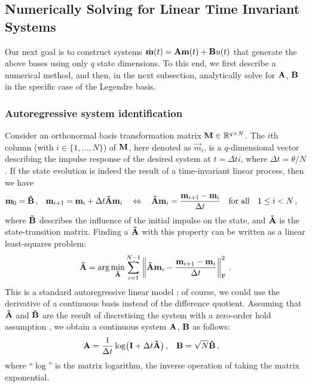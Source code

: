 \subsection{Numerically Solving for Linear Time Invariant Systems}
\label{sec:lti_autoregression}

Our next goal is to construct \LTI systems $\dot{\mathbf{m}}(t) = \mathbf{A} \mathbf{m}(t) + \mathbf{B} u(t)$ that generate the above bases using only $q$ state dimensions.
To this end, we first describe a numerical method, and then, in the next subsection, analytically solve for $\mathbf{A}$, $\mathbf{B}$ in the specific case of the Legendre basis.

\subsubsection{Autoregressive system identification}
Consider an orthonormal basis transformation matrix $\mathbf{M} \in \mathbb{R}^{q \times N}$. The $i$th column (with $i \in \{1, \ldots, N\}$) of $\mathbf{M}$, here denoted as $\vec m_i$, is a $q$-dimensional vector describing the impulse response of the desired system at $t = \Delta t i$, where $\Delta t = \theta / N$.
If the state evolution is indeed the result of a time-invariant linear process, then we have
\begin{align*}
	\mathbf{m}_0 &= \mathbf{\tilde B} \,, &
	\mathbf{m}_{i + 1} &= \mathbf{m}_{i} + \Delta t \mathbf{\tilde A} \mathbf{m}_i
	\quad \Leftrightarrow \quad
	\mathbf{\tilde A} \mathbf{m}_{i} = \frac{\mathbf{m}_{i + 1} - \mathbf{m}_i}{\Delta t} \quad \text{for all} \quad 1 \leq i < N \,,
\end{align*}
where $\mathbf{\tilde B}$ describes the influence of the initial impulse on the state, and $\mathbf{\tilde A}$ is the state-transition matrix.
Finding a $\mathbf{\tilde A}$ with this property can be written as a linear least-squares problem:
\begin{align}
	\mathbf{\tilde A} = \arg\min_{\mathbf{\tilde A}} \sum_{i = 1}^{N - 1} \left\| \mathbf{\tilde A} \mathbf{m}_i - \frac{\mathbf{m}_{i + 1} - \mathbf{m}_i}{\Delta t} \right\|_\mathrm{F}^2 \,.
	\label{eqn:construct_lti_lstsq}
\end{align}
This is a standard autoregressive linear model \citep[cf.][Chapter~8]{verhaegen2007filtering}; of course, we could use the derivative of a continuous basis instead of the difference quotient.
Assuming that $\mathbf{\tilde A}$ and $\mathbf{\tilde B}$ are the result of discretising the \LTI system with a zero-order hold assumption \citep[e.g.,][Section~9.8]{brogan1991modern}, we obtain a continuous system $\mathbf{A}$, $\mathbf{B}$ as follows:
\begin{align}
 	\mathbf{A} &= \frac{1}{\Delta t} \log\bigl(\mathbf{I}  + \Delta t \mathbf{\tilde A}\bigr) \,, &
 	\mathbf{B} &= \sqrt{N} \mathbf{\tilde B} \,,
 	\label{eqn:lti_inverse_discretisation}
\end{align}
where \enquote{$\log$} is the matrix logarithm, the inverse operation of taking the matrix exponential.

